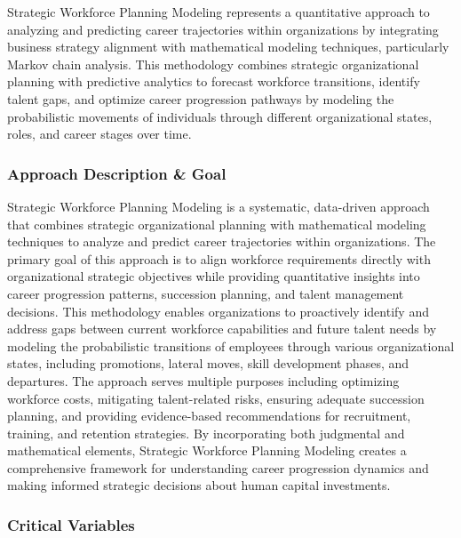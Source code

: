 \documentclass[main.tex]{subfiles}
\begin{document}
Strategic Workforce Planning Modeling represents a quantitative approach to analyzing and predicting career trajectories within organizations by integrating business strategy alignment with mathematical modeling techniques, particularly Markov chain analysis. This methodology combines strategic organizational planning with predictive analytics to forecast workforce transitions, identify talent gaps, and optimize career progression pathways by modeling the probabilistic movements of individuals through different organizational states, roles, and career stages over time\parencite{qualee2025,aihr2024}.

\subsubsection{Approach Description \& Goal}

Strategic Workforce Planning Modeling is a systematic, data-driven approach that combines strategic organizational planning with mathematical modeling techniques to analyze and predict career trajectories within organizations\parencite{gartner2024,qualee2025}. The primary goal of this approach is to align workforce requirements directly with organizational strategic objectives while providing quantitative insights into career progression patterns, succession planning, and talent management decisions\parencite{aihr2024,staffany2023}. This methodology enables organizations to proactively identify and address gaps between current workforce capabilities and future talent needs by modeling the probabilistic transitions of employees through various organizational states, including promotions, lateral moves, skill development phases, and departures\parencite{coursehero2024,opm2022}. The approach serves multiple purposes including optimizing workforce costs, mitigating talent-related risks, ensuring adequate succession planning, and providing evidence-based recommendations for recruitment, training, and retention strategies\parencite{gartner2024,thinkdev2023}. By incorporating both judgmental and mathematical elements, Strategic Workforce Planning Modeling creates a comprehensive framework for understanding career progression dynamics and making informed strategic decisions about human capital investments\parencite{coursehero2024,mit2022}.

\subsubsection{Critical Variables}
\end{document}
